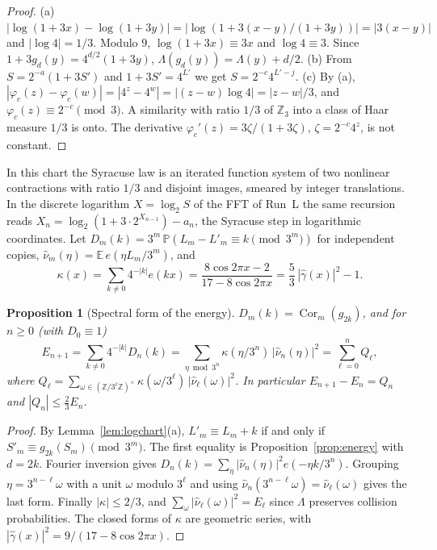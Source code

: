 \documentclass[12pt]{amsart}
\newtheorem{proposition}{Proposition}
\theoremstyle{definition}
\theoremstyle{remark}
\newcommand{\Z}{\mathbb{Z}}
\begin{document}
\begin{proof}
(a) $|\log(1+3x)-\log(1+3y)|=|\log(1+3(x-y)/(1+3y))|=|3(x-y)|$ and $|\log4|=1/3$. Modulo $9$, $\log(1+3x)\equiv3x$ and $\log4\equiv3$. Since $1+3g_d(y)=4^{d/2}(1+3y)$, $\Lambda(g_d(y))=\Lambda(y)+d/2$. (b) From $S=2^{-a}(1+3S')$ and $1+3S'=4^{L'}$ we get $S=2^{-c}4^{L'-j}$. (c) By (a), $|\varphi_c(z)-\varphi_c(w)|=|4^z-4^w|=|(z-w)\log4|=|z-w|/3$, and $\varphi_c(z)\equiv2^{-c}\pmod3$. A similarity with ratio $1/3$ of $\Z_3$ into a class of Haar measure $1/3$ is onto. The derivative $\varphi_c'(z)=3\zeta/(1+3\zeta)$, $\zeta=2^{-c}4^z$, is not constant.
\end{proof}

In this chart the Syracuse law is an iterated function system of two nonlinear contractions with ratio $1/3$ and disjoint images, smeared by integer translations. In the discrete logarithm $X=\log_2S$ of the FFT of Run~L the same recursion reads $X_n=\log_2(1+3\cdot2^{X_{n-1}})-a_n$, the Syracuse step in logarithmic coordinates. Let $D_m(k)=3^m\,\mathbb P(L_m-L'_m\equiv k\pmod{3^m})$ for independent copies, $\widehat\nu_m(\eta)=\mathbb E\,e(\eta L_m/3^m)$, and
\[
 \kappa(x)=\sum_{k\ne0}4^{-|k|}e(kx)=\frac{8\cos2\pi x-2}{17-8\cos2\pi x}=\frac53\,|\widehat\gamma(x)|^2-1 .
\]

\begin{proposition}[Spectral form of the energy]
\label{prop:spectral}
$D_m(k)=\operatorname{Cor}_m(g_{2k})$, and for $n\ge0$ (with $D_0\equiv1$)
\[
 E_{n+1}=\sum_{k\ne0}4^{-|k|}D_n(k)=\sum_{\eta\bmod3^n}\kappa(\eta/3^n)\,|\widehat\nu_n(\eta)|^2=\sum_{\ell=0}^nQ_\ell,
\]
where $Q_\ell=\sum_{\omega\in(\Z/3^\ell\Z)^\times}\kappa(\omega/3^\ell)\,|\widehat\nu_\ell(\omega)|^2$.
In particular $E_{n+1}-E_n=Q_n$ and $|Q_n|\le\frac23E_n$.
\end{proposition}

\begin{proof}
By Lemma~\ref{lem:logchart}(a), $L'_m\equiv L_m+k$ if and only if $S'_m\equiv g_{2k}(S_m)\pmod{3^m}$. The first equality is Proposition~\ref{prop:energy} with $d=2k$. Fourier inversion gives $D_n(k)=\sum_\eta|\widehat\nu_n(\eta)|^2e(-\eta k/3^n)$. Grouping $\eta=3^{n-\ell}\omega$ with a unit $\omega$ modulo $3^\ell$ and using $\widehat\nu_n(3^{n-\ell}\omega)=\widehat\nu_\ell(\omega)$ gives the last form. Finally $|\kappa|\le2/3$, and $\sum_\omega|\widehat\nu_\ell(\omega)|^2=E_\ell$ since $\Lambda$ preserves collision probabilities. The closed forms of $\kappa$ are geometric series, with $|\widehat\gamma(x)|^2=9/(17-8\cos2\pi x)$.
\end{proof}
\end{document}
